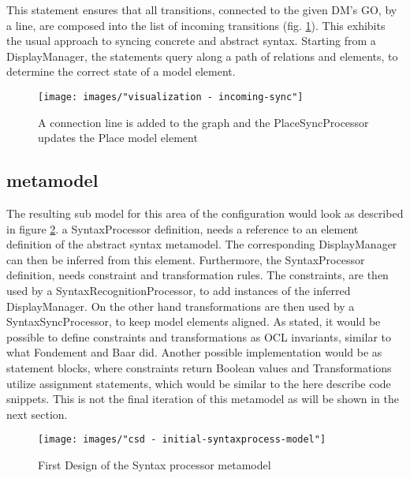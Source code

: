 This statement ensures that all transitions, connected to the given DM's GO, by a line, are composed into the list of incoming transitions (fig. \ref{fig:incoming-sync}). This exhibits the usual approach to syncing concrete and abstract syntax. Starting from a DisplayManager, the statements query along a path of relations and elements, to determine the correct state of a model element.


\begin{figure}
  \centering
  \texttt{[image: images/"visualization - incoming-sync"]}
  \caption{A connection line is added to the graph and the PlaceSyncProcessor updates the Place model element}
  \label{fig:incoming-sync}
\end{figure}

\subsection{metamodel}
The resulting sub model for this area of the configuration would look as described in figure \ref{fig:initial-syntax-model}. a SyntaxProcessor definition, needs a reference to an element definition of the abstract syntax metamodel. The corresponding DisplayManager can then be inferred from this element. Furthermore, the SyntaxProcessor definition, needs constraint and transformation rules. The constraints, are then used by a SyntaxRecognitionProcessor, to add instances of the inferred DisplayManager. On the other hand transformations are then used by a SyntaxSyncProcessor, to keep model elements aligned. As stated, it would be possible to define constraints and transformations as OCL invariants, similar to what Fondement and Baar did. Another possible implementation would be as statement blocks, where constraints return Boolean values and Transformations utilize assignment statements, which would be similar to the here describe code snippets. This is not the final iteration of this metamodel as will be shown in the next section.

\begin{figure}
\centering
\texttt{[image: images/"csd - initial-syntaxprocess-model"]}
\caption{First Design of the Syntax processor metamodel}
\label{fig:initial-syntax-model}
\end{figure}


